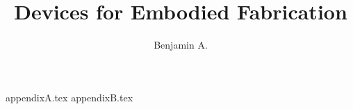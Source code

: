 \documentclass[defaultstyle,11pt]{thesis}
\title{Devices for Embodied Fabrication}
\author{Benjamin A.}{Leduc-Mills}
\begin{document}








\nocite{*}		%

\appendix

 {appendixA.tex}
 {appendixB.tex}
\end{document}
